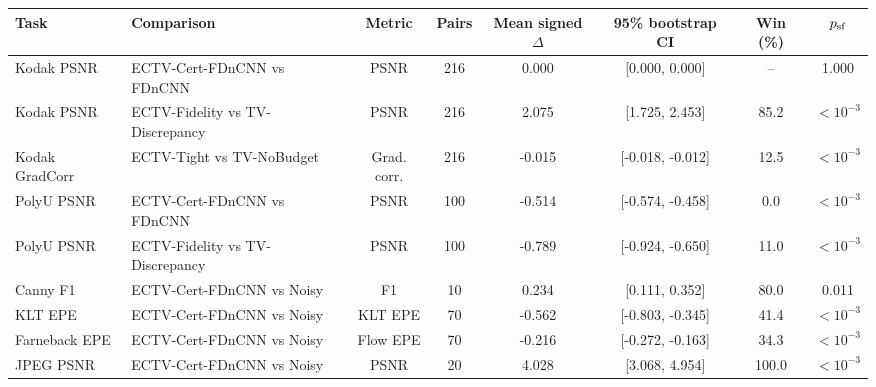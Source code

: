 \begin{tabular}{llcccccc}
\toprule
Task & Comparison & Metric & Pairs & Mean signed $\Delta$ & 95\% bootstrap CI & Win (\%) & $p_{\rm sf}$ \\
\midrule
Kodak PSNR & ECTV-Cert-FDnCNN vs FDnCNN & PSNR & 216 & 0.000 & [0.000, 0.000] & -- & 1.000 \\
Kodak PSNR & ECTV-Fidelity vs TV-Discrepancy & PSNR & 216 & 2.075 & [1.725, 2.453] & 85.2 & $<10^{-3}$ \\
Kodak GradCorr & ECTV-Tight vs TV-NoBudget & Grad. corr. & 216 & -0.015 & [-0.018, -0.012] & 12.5 & $<10^{-3}$ \\
PolyU PSNR & ECTV-Cert-FDnCNN vs FDnCNN & PSNR & 100 & -0.514 & [-0.574, -0.458] & 0.0 & $<10^{-3}$ \\
PolyU PSNR & ECTV-Fidelity vs TV-Discrepancy & PSNR & 100 & -0.789 & [-0.924, -0.650] & 11.0 & $<10^{-3}$ \\
Canny F1 & ECTV-Cert-FDnCNN vs Noisy & F1 & 10 & 0.234 & [0.111, 0.352] & 80.0 & 0.011 \\
KLT EPE & ECTV-Cert-FDnCNN vs Noisy & KLT EPE & 70 & -0.562 & [-0.803, -0.345] & 41.4 & $<10^{-3}$ \\
Farneback EPE & ECTV-Cert-FDnCNN vs Noisy & Flow EPE & 70 & -0.216 & [-0.272, -0.163] & 34.3 & $<10^{-3}$ \\
JPEG PSNR & ECTV-Cert-FDnCNN vs Noisy & PSNR & 20 & 4.028 & [3.068, 4.954] & 100.0 & $<10^{-3}$ \\
\bottomrule
\end{tabular}
